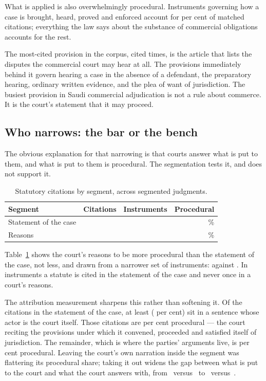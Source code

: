 \documentclass[11pt]{article}
\begin{document}
What is applied is also overwhelmingly procedural. Instruments governing how
a case is brought, heard, proved and enforced account for
\nProceduralShare{} per cent of matched citations; everything the law says
about the substance of commercial obligations accounts for the rest.

The most-cited provision in the corpus, cited \nTopArticleCitations{} times,
is the article that lists the disputes the commercial court may hear at all.
The provisions immediately behind it govern hearing a case in the absence of
a defendant, the preparatory hearing, ordinary written evidence, and the plea
of want of jurisdiction. The busiest provision in Saudi commercial
adjudication is not a rule about commerce. It is the court's statement that it
may proceed.

\subsection{Who narrows: the bar or the bench}

The obvious explanation for that narrowing is that courts answer what is put
to them, and what is put to them is procedural. The segmentation tests it, and
does not support it.

\begin{table}[t]
\centering
\caption{Statutory citations by segment, across \nSegmented{} segmented
judgments.}
\label{tab:voices}
\begin{tabular}{lrrr}
\toprule
Segment & Citations & Instruments & Procedural \\
\midrule
Statement of the case & \nRecitalCitations{} & \nRecitalInstruments{} & \nRecitalProcedural{}\% \\
Reasons               & \nReasoningCitations{} & \nReasoningInstruments{} & \nReasoningProcedural{}\% \\
\bottomrule
\end{tabular}
\end{table}

Table~\ref{tab:voices} shows the court's reasons to be more procedural than
the statement of the case, not less, and drawn from a narrower set of
instruments: \nReasoningInstruments{} against \nRecitalInstruments{}.
In \nRecitalOnlyInstruments{} instruments a statute is cited in the statement
of the case and never once in a court's reasons.

The attribution measurement sharpens this rather than softening it. Of the
\nRecitalCitations{} citations in the statement of the case, at least
\nRecitalByCourt{} (\nRecitalByCourtShare{} per cent) sit in a sentence whose
actor is the court itself. Those citations are \nRecitalCourtProcedural{} per
cent procedural --- the court reciting the provisions under which it convened,
proceeded and satisfied itself of jurisdiction. The remainder, which is where
the parties' arguments live, is \nRecitalOtherProcedural{} per cent
procedural. Leaving the court's own narration inside the segment was
flattering its procedural share; taking it out widens the gap between what is
put to the court and what the court answers with, from
\nRecitalProcedural{}~versus~\nReasoningProcedural{} to
\nRecitalOtherProcedural{}~versus~\nReasoningProcedural{}.
\end{document}
